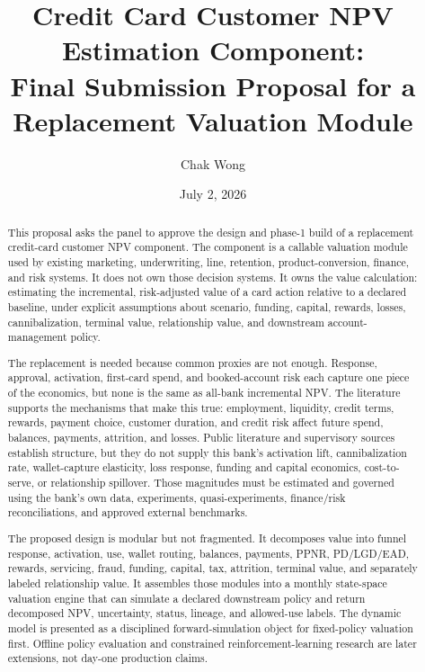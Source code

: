 \documentclass[11pt]{article}
\title{Credit Card Customer NPV Estimation Component:\\
Final Submission Proposal for a Replacement Valuation Module}
\author{Chak Wong}
\date{July 2, 2026}
\newcommand{\1}{\mathbf{1}}
\begin{document}
\maketitle

\begin{abstract}
This proposal asks the panel to approve the design and phase-1 build of a
replacement credit-card customer NPV component. The component is a callable
valuation module used by existing marketing, underwriting, line, retention,
product-conversion, finance, and risk systems. It does not own those decision
systems. It owns the value calculation: estimating the incremental,
risk-adjusted value of a card action relative to a declared baseline, under
explicit assumptions about scenario, funding, capital, rewards, losses,
cannibalization, terminal value, relationship value, and downstream
account-management policy.

The replacement is needed because common proxies are not enough. Response,
approval, activation, first-card spend, and booked-account risk each capture
one piece of the economics, but none is the same as all-bank incremental NPV.
The literature supports the mechanisms that make this true: employment,
liquidity, credit terms, rewards, payment choice, customer duration, and credit
risk affect future spend, balances, payments, attrition, and losses. Public
literature and supervisory sources establish structure, but they do not supply
this bank's activation lift, cannibalization rate, wallet-capture elasticity,
loss response, funding and capital economics, cost-to-serve, or relationship
spillover. Those magnitudes must be estimated and governed using the bank's
own data, experiments, quasi-experiments, finance/risk reconciliations, and
approved external benchmarks.

The proposed design is modular but not fragmented. It decomposes value into
funnel response, activation, use, wallet routing, balances, payments, PPNR,
PD/LGD/EAD, rewards, servicing, fraud, funding, capital, tax, attrition,
terminal value, and separately labeled relationship value. It assembles those
modules into a monthly state-space valuation engine that can simulate a
declared downstream policy and return decomposed NPV, uncertainty, status,
lineage, and allowed-use labels. The dynamic model is presented as a disciplined
forward-simulation object for fixed-policy valuation first. Offline policy
evaluation and constrained reinforcement-learning research are later
extensions, not day-one production claims.


\end{abstract}
\end{document}

